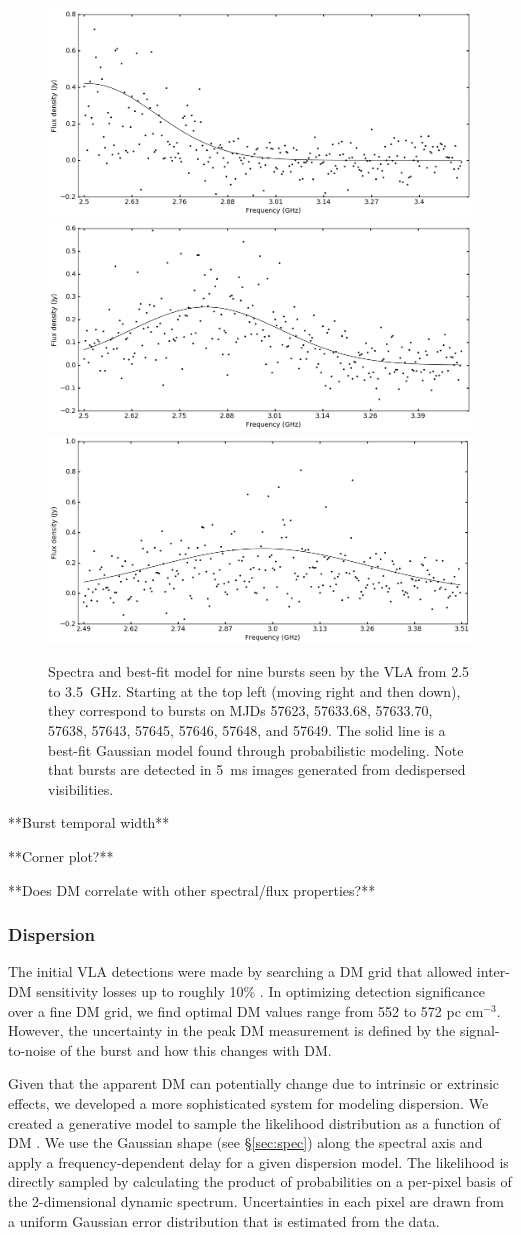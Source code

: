 \documentclass[twocolumn]{aastex61}
\begin{document}
\begin{figure}[ht]
\begin{center}
 \begin{minipage}{2\columnwidth}
  \includegraphics[width=0.33\columnwidth]{spec_57646.png}
  \includegraphics[width=0.33\columnwidth]{spec_57648.png}
  \includegraphics[width=0.33\columnwidth]{spec_57649.png}
 \end{minipage}
\caption{Spectra and best-fit model for nine bursts seen by the VLA from 2.5 to 3.5~GHz. Starting at the top left (moving right and then down), they correspond to bursts on MJDs 57623, 57633.68, 57633.70, 57638, 57643, 57645, 57646, 57648, and 57649. The solid line is a best-fit Gaussian model found through probabilistic modeling. Note that bursts are detected in 5~ms images generated from dedispersed visibilities.
\label{fig:spec}}
\end{center}
\end{figure}

**Burst temporal width**

**Corner plot?**

**Does DM correlate with other spectral/flux properties?**


\subsubsection{Dispersion}
The initial VLA detections were made by searching a DM grid that allowed inter-DM sensitivity losses up to roughly 10\% \citep[$\Delta DM=10\ \rm{pc}\ \rm{cm}^{-3}$][]{2003ApJ...596.1142C}. In optimizing detection significance over a fine DM grid, we find optimal DM values range from 552 to 572 pc cm$^{-3}$. However, the uncertainty in the peak DM measurement is defined by the signal-to-noise of the burst and how this changes with DM.

Given that the apparent DM can potentially change due to intrinsic or extrinsic effects, we developed a more sophisticated system for modeling dispersion. We created a generative model to sample the likelihood distribution as a function of DM \citep{2010arXiv1008.4686H}. We use the Gaussian shape (see \S \ref{sec:spec}) along the spectral axis and apply a frequency-dependent delay for a given dispersion model. The likelihood is directly sampled by calculating the product of probabilities on a per-pixel basis of the 2-dimensional dynamic spectrum. Uncertainties in each pixel are drawn from a uniform Gaussian error distribution that is estimated from the data.
\end{document}
